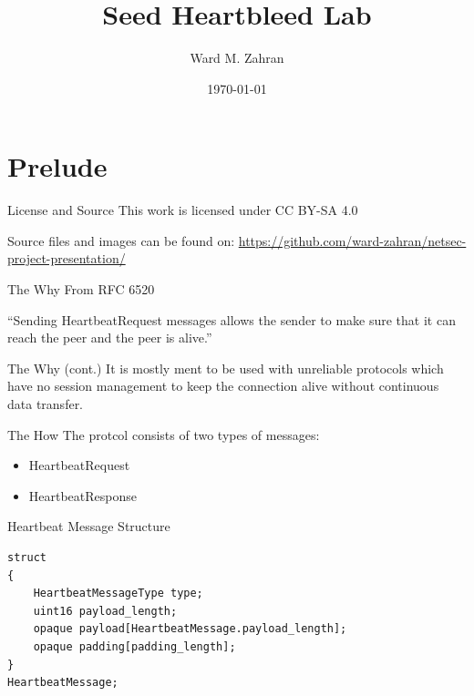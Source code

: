 \documentclass{beamer}
\title{Seed Heartbleed Lab}
\date{\today}
\author{Ward M. Zahran}
\institute{University of Jordan}
\begin{document}
\maketitle
\section{Prelude}

\begin{frame}{License and Source}
    This work is licensed under CC BY-SA 4.0

    Source files and images can be found on:
    \href{https://github.com/ward-zahran/netsec-project-presentation/}{https://github.com/ward-zahran/netsec-project-presentation/}


\end{frame}

\begin{frame}{The Why}
    From RFC 6520

    ``Sending HeartbeatRequest messages allows the sender to make sure that it can reach the peer and the peer is alive.''

\end{frame}

\begin{frame}{The Why (cont.)}
    It is mostly ment to be used with unreliable protocols which have no session management
    to keep the connection alive without continuous data transfer.
\end{frame}

\begin{frame}{The How}
    The protcol consists of two types of messages:
    \begin{itemize}
        \item HeartbeatRequest
        \item HeartbeatResponse
    \end{itemize}
\end{frame}


\begin{frame}[fragile]{Heartbeat Message Structure}
    \begin{verbatim}
struct
{
    HeartbeatMessageType type;
    uint16 payload_length;
    opaque payload[HeartbeatMessage.payload_length];
    opaque padding[padding_length];
}
HeartbeatMessage;

    \end{verbatim}


\end{frame}
\end{document}
